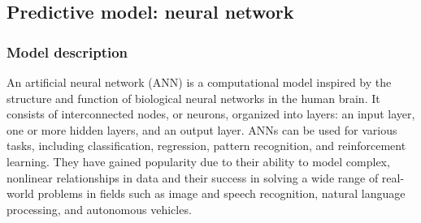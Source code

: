 \documentclass[10pt]{article}
\begin{document}
\subsection{Predictive model: neural network }

\subsubsection{Model description}

An artificial neural network (ANN) is a computational model inspired by the structure and function of biological neural networks in the human brain. It consists of interconnected nodes, or neurons, organized into layers: an input layer, one or more hidden layers, and an output layer. ANNs can be used for various tasks, including classification, regression, pattern recognition, and reinforcement learning. They have gained popularity due to their ability to model complex, nonlinear relationships in data and their success in solving a wide range of real-world problems in fields such as image and speech recognition, natural language processing, and autonomous vehicles.
\end{document}
